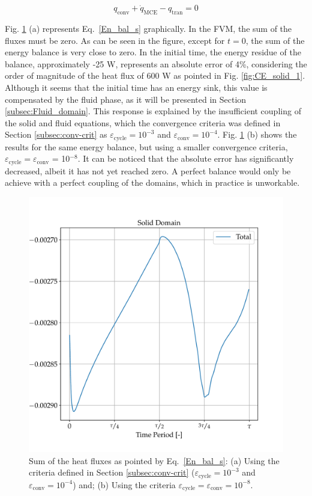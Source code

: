 \documentclass[review,preprint,12pt]{elsarticle}
\begin{document}
\begin{equation}
\label{En_bal_s}
q_\textrm{conv} + \dot{q}_\textrm{MCE} - q_\textrm{tran} = 0
\end{equation}

Fig. \ref{fig:CE_solid_2} (a) represents Eq.~\eqref{En_bal_s} graphically. In the FVM, the sum of the fluxes must be zero. As can be seen in the figure, except for $t = 0$, the sum of the energy balance is very close to zero. In the initial time, the energy residue of the balance, approximately -25 W, represents an absolute error of 4\%, considering the order of magnitude of the heat flux of 600 W as pointed in Fig. \ref{fig:CE_solid_1}. Although it seems that the initial time has an energy sink, this value is compensated by the fluid phase, as it will be presented in Section \ref{subsec:Fluid_domain}. This response is explained by the insufficient coupling of the solid and fluid equations, which the convergence criteria was defined in Section \ref{subsec:conv-crit} as $\varepsilon_\textrm{cycle}= 10^{-3}$ and $\varepsilon_\textrm{conv} = 10^{-4}$. Fig. \ref{fig:CE_solid_2} (b) shows the results for the same energy balance, but using a smaller convergence criteria, $\varepsilon_\textrm{cycle}= \varepsilon_\textrm{conv}$ = 10$^{-8}$. It can be noticed that the absolute error has significantly decreased, albeit it has not yet reached zero. A perfect balance would only be achieve with a perfect coupling of the domains, which in practice is unworkable.

\begin{figure}[!ht]
  \centering
  \includegraphics[scale=0.6]{CE_solid_3.pdf}
  \caption{Sum of the heat fluxes as pointed by Eq.~\eqref{En_bal_s}: (a) Using the criteria defined in Section \ref{subsec:conv-crit} ($\varepsilon_\textrm{cycle}= 10^{-3}$ and $\varepsilon_\textrm{conv} = 10^{-4}$) and; (b) Using the criteria $\varepsilon_\textrm{cycle}= \varepsilon_\textrm{conv} = 10^{-8}$.}
  \label{fig:CE_solid_2}
\end{figure}
\end{document}
